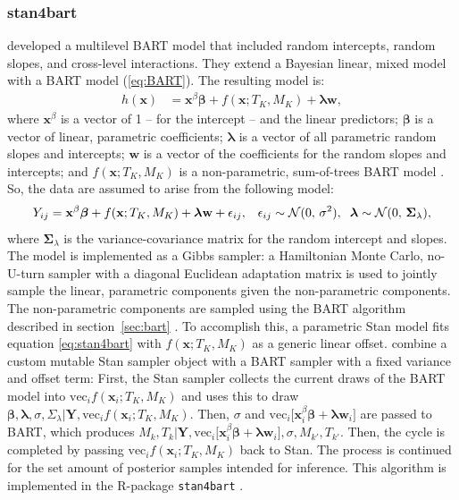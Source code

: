\documentclass[10pt, a4paper, titlepage]{article}
\begin{document}
\subsubsection{stan4bart}
\citet{dorie2022} developed a multilevel BART model that included random intercepts, random slopes, and cross-level interactions. They extend a Bayesian linear, mixed model with a BART model (\ref{eq:BART}). The resulting model is:
\begin{align}
    \label{eq:stan4bart}
    h(\textbf{x}) &= \mathbf{x}^{\beta}\boldsymbol{\beta} + f(\mathbf{x}; T_{K}, M_{K}) + \boldsymbol{\lambda}\mathbf{w},
\end{align} where $\mathbf{x}^{\beta}$ is a vector of 1 -- for the intercept -- and the linear predictors; $\boldsymbol{\beta}$ is a vector of linear, parametric coefficients; $\boldsymbol{\lambda}$ is a vector of all parametric random slopes and intercepts; $\mathbf{w}$ is a vector of the coefficients for the random slopes and intercepts; and $f(\mathbf{x}; T_{K}, M_{K})$ is a non-parametric, sum-of-trees BART model \citep{dorie2022}. So, the data are assumed to arise from the following model:
\begin{align}
    \label{eq:stan4bart_model}
    Y_{ij} = \mathbf{x}^{\beta}\boldsymbol{\beta} + f(\mathbf{x}; T_{K}, M_{K}) + \boldsymbol{\lambda}\mathbf{w} + \epsilon_{ij}, & &\epsilon_{ij} \sim \mathcal{N}(0,\,\sigma^{2}), \hspace{.2cm} \boldsymbol{\lambda} \sim \mathcal{N}(0,\,\boldsymbol{\Sigma}_{\lambda}),
\end{align} where $\boldsymbol{\Sigma}_{\lambda}$ is the variance-covariance matrix for the random intercept and slopes. The model is implemented as a Gibbs sampler: a  Hamiltonian Monte Carlo, no-U-turn sampler with a diagonal Euclidean adaptation matrix is used to jointly sample the linear, parametric components given the non-parametric components. The non-parametric components are sampled using the BART algorithm described in section~\ref{sec:bart} \citep{dorie2022}. To accomplish this, a parametric Stan model \citep{lee2017} fits equation \ref{eq:stan4bart} with $f(\mathbf{x}; T_{K}, M_{K})$ as a generic linear offset. \citet{dorie2022} combine a custom mutable Stan sampler object with a BART sampler with a fixed variance and offset term: First, the Stan sampler collects the current draws of the BART model into $\text{vec}_if(\mathbf{x}_{i}; T_{K}, M_{K})$ and uses this to draw $\mathbf{\beta}, \mathbf{\lambda}, \sigma, \Sigma_\lambda | \mathbf{Y}, \text{vec}_if(\mathbf{x}_{i}; T_{K}, M_{K})$. Then, $\sigma$ and $\text{vec}_i\big[\mathbf{x}_i^{\beta}\boldsymbol{\beta} + \boldsymbol{\lambda}\mathbf{w}_i\big]$ are passed to BART, which produces $M_k,T_k | \mathbf{Y}, \text{vec}_i\big[\mathbf{x}_i^{\beta}\boldsymbol{\beta} + \boldsymbol{\lambda}\mathbf{w}_i\big], \sigma, M_{k'}, T_{k'}$. Then, the cycle is completed by passing $\text{vec}_if(\mathbf{x}_{i}; T_{K}, M_{K})$ back to Stan. The process is continued for the set amount of posterior samples intended for inference. This algorithm is implemented in the R-package \texttt{stan4bart} \citep{dorie2023a}.
\end{document}
